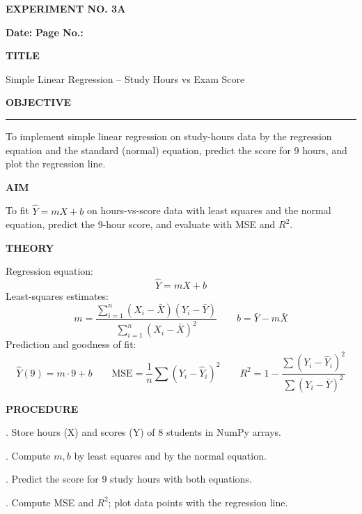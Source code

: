 \documentclass[11pt,twoside]{article}
\newcommand{\expheading}[1]{{\fontsize{14}{17}\selectfont\textbf{#1}\par}}
\newcommand{\fullrule}{\noindent\rule{\textwidth}{0.6pt}\par}
\begin{document}
{\setlength{\parskip}{1pt}\setlength{\abovedisplayskip}{2pt}\setlength{\belowdisplayskip}{2pt}
\begin{center}
\expheading{EXPERIMENT NO. 3A}
\end{center}
\vspace{2pt}

\noindent\textbf{Date:} \underline{\hspace{2.6cm}} \hfill \textbf{Page No.:} \underline{\hspace{2.6cm}}\par
\vspace{6pt}

\expheading{TITLE}
\vspace{4pt}
\noindent Simple Linear Regression -- Study Hours vs Exam Score\par
\vspace{4pt}

\expheading{OBJECTIVE}
\vspace{2pt}
\fullrule
\vspace{4pt}
\noindent To implement simple linear regression on study-hours data by the regression equation and the standard (normal) equation, predict the score for 9 hours, and plot the regression line. \par
\vspace{4pt}

\expheading{AIM}
\vspace{4pt}
\noindent To fit $\hat{Y}=mX+b$ on hours-vs-score data with least squares and the normal equation, predict the 9-hour score, and evaluate with MSE and $R^2$. \par
\vspace{4pt}

\expheading{THEORY}
\vspace{4pt}
Regression equation:
\[\hat{Y}=mX+b\]
Least-squares estimates:
\[m=\frac{\sum_{i=1}^{n}(X_i-\bar{X})(Y_i-\bar{Y})}{\sum_{i=1}^{n}(X_i-\bar{X})^2}\qquad b=\bar{Y}-m\bar{X}\]
Prediction and goodness of fit:
\[\hat{Y}(9)=m\cdot9+b\qquad \mathrm{MSE}=\frac{1}{n}\sum(Y_i-\hat{Y}_i)^2\qquad R^2=1-\frac{\sum(Y_i-\hat{Y}_i)^2}{\sum(Y_i-\bar{Y})^2}\]
\vspace{4pt}

\expheading{PROCEDURE}
\vspace{4pt}
. Store hours (X) and scores (Y) of 8 students in NumPy arrays.\par
{}. Compute $m,b$ by least squares and by the normal equation.\par
{}. Predict the score for 9 study hours with both equations.\par
{}. Compute MSE and $R^2$; plot data points with the regression line. \par
\vspace{4pt}

}
\end{document}

